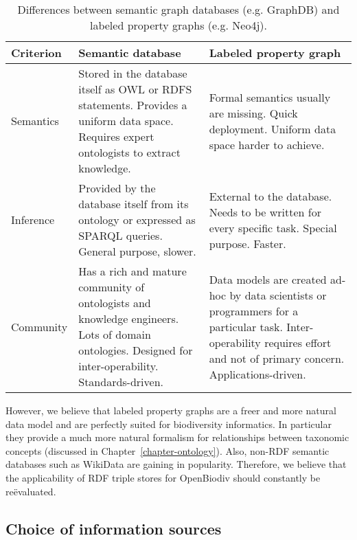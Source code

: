 \begin{table}
\caption{Differences between semantic graph databases (e.g. GraphDB) and labeled property graphs (e.g. Neo4j).}
\begin{tabular}{>{\centering\arraybackslash}m{2.5cm}|>{\centering\arraybackslash}m{4.2cm}|>{\centering\arraybackslash}m{4.2cm}}
Criterion   & Semantic database & Labeled property graph\\
\hline
Semantics   & Stored in the database itself as OWL or RDFS statements. Provides a uniform data space. Requires expert ontologists to extract knowledge.
            & Formal semantics usually are missing. Quick deployment. Uniform data space harder to achieve.\\
\hline
Inference   & Provided by the database itself from its ontology or expressed as SPARQL queries. General purpose, slower.
            & External to the database. Needs to be written for every specific task. Special purpose. Faster.\\
\hline
Community   & Has a rich and mature community of ontologists and knowledge engineers. Lots of domain ontologies. Designed for inter-operability. Standards-driven.
            & Data models are created ad-hoc by data scientists or programmers for a particular task. Inter-operability requires effort and not of primary concern. Applications-driven.\\
\hline
\end{tabular}
\label{graphdb-vs-neo4k}
\end{table}

However, we believe that labeled property graphs are a freer and more natural data model and are perfectly suited for biodiversity informatics. In particular they provide a much more natural formalism for relationships between taxonomic concepts (discussed in Chapter~\ref{chapter-ontology}). Also, non-RDF semantic databases such as \mbox{WikiData} are gaining in popularity. Therefore, we believe that the applicability of RDF triple stores for OpenBiodiv should constantly be re\"evaluated.

\subsection*{Choice of information sources}

